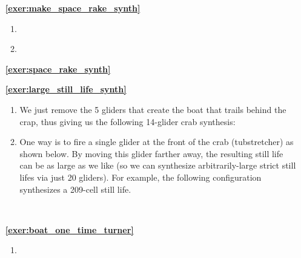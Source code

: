 \begin{multicols}{2}
\begin{itemize}[leftmargin=0em]
	\item[\bf\color{ocre}\sffamily\ref{exer:make_space_rake_synth}]
	\begin{enumerate}[leftmargin=1.5em,label=\bf\color{ocre}(\alph*)]
		\item {} \\
		
		\item {} \\
	\end{enumerate}

	
	\item[\bf\color{ocre}\sffamily\ref{exer:space_rake_synth}]  \\
	
	
	\item[\bf\color{ocre}\sffamily\ref{exer:large_still_life_synth}]
	\begin{enumerate}[leftmargin=1.5em,label=\bf\color{ocre}(\alph*),series=solu_one_time]
		\item We just remove the 5 gliders that create the boat that trails behind the crap, thus giving us the following 14-glider crab synthesis:
		\begin{center}
		\end{center}

		\item One way is to fire a single glider at the front of the crab (tubstretcher) as shown below. By moving this glider farther away, the resulting still life can be as large as we like (so we can synthesize arbitrarily-large strict still lifes via just 20 gliders). For example, the following configuration synthesizes a 209-cell still life.
		\begin{center}
			 \\
		\end{center}
	\end{enumerate}
	
	
	\item[\bf\color{ocre}\sffamily\ref{exer:boat_one_time_turner}]
	\begin{enumerate}[leftmargin=1.5em,label=\bf\color{ocre}(\alph*),series=solu_one_time]
		\item {}
			

\end{enumerate}
\end{itemize}
\end{multicols}
